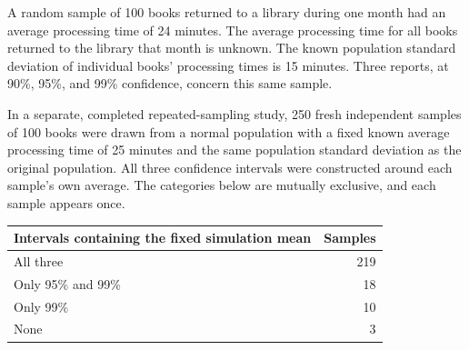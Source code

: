 \noindent\begin{minipage}[t]{0.60\linewidth}
\vspace{0pt}
A random sample of 100 books returned to a library during one month had an average processing time of 24 minutes. The average processing time for all books returned to the library that month is unknown. The known population standard deviation of individual books' processing times is 15 minutes. Three reports, at 90\%, 95\%, and 99\% confidence, concern this same sample.

In a separate, completed repeated-sampling study, 250 fresh independent samples of 100 books were drawn from a normal population with a fixed known average processing time of 25 minutes and the same population standard deviation as the original population. All three confidence intervals were constructed around each sample's own average. The categories below are mutually exclusive, and each sample appears once.
\end{minipage}\hfill
\begin{minipage}[t]{0.38\linewidth}
\vspace{0pt}
\centering
\small
\setlength{\tabcolsep}{4pt}
\begin{tabularx}{\linewidth}{@{}>{\raggedright\arraybackslash}Xr@{}}\toprule
Intervals containing the fixed simulation mean & Samples\\\midrule
All three & 219\\
Only 95\% and 99\% & 18\\
Only 99\% & 10\\
None & 3\\
\bottomrule\end{tabularx}
\end{minipage}\par

